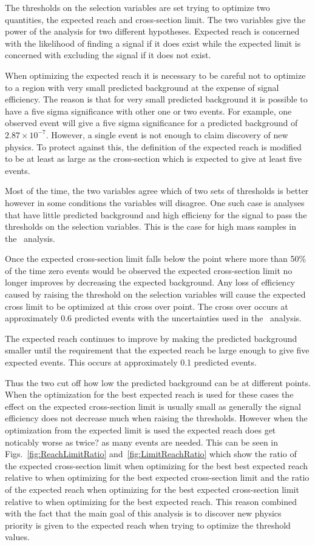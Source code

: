 The thresholds on the selection variables are set trying to optimize two quantities, the expected reach and cross-section limit.
The two variables give the power of the analysis for two different hypotheses. Expected reach is concerned with the likelihood of finding a signal if it does exist while the
expected limit is concerned with excluding the signal if it does not exist.

When optimizing the expected reach it is necessary to be careful not to optimize to
a region with very small predicted background at the expense of signal efficiency. 
The reason is that for very small predicted background it is possible to have a five sigma
significance with other one or two events. For example, one observed event will give a five sigma significance for a predicted background of $2.87\times10^{-7}$.
However, a single event is not enough to claim discovery of new physics. To protect against this, the definition of the expected reach is modified to be at least as large as
the cross-section which is expected to give at least five events.

Most of the time, the two variables agree which of two sets of thresholds is better however in some
conditions the variables will disagree. One such case is analyses that have little predicted background and high efficieny for the signal to pass the thresholds on the
selection variables. This is the case for high mass samples in the \tktof\ analysis.

Once the expected cross-section limit falls below the point where more than 50\% of the time zero events would be observed the expected cross-section limit no longer improves
by decreasing the expected background. Any loss of efficiency caused by raising the threshold on the selection variables will cause the expected cross limit to be optimized
at this cross over point. The cross over occurs at approximately 0.6 predicted events with the uncertainties used in the \tktof\ analysis. 

The expected reach continues to improve by making the predicted background smaller until the requirement that the expected reach be large enough to give five expected events. 
This occurs at approximately 0.1 predicted events. 

Thus the two cut off how low the predicted background can be at different points. When the optimization for the best expected reach is used for these cases the
effect on the expected cross-section limit is usually small as generally the signal efficiency does not decrease much when raising the thresholds. However
when the optimization from the expected limit is used the expected reach does get noticably worse as twice? as many events are needed. This can be seen in
Figs.~\ref{fig:ReachLimitRatio} and~\ref{fig:LimitReachRatio} which show the ratio of the expected cross-section limit when optimizing for the best best expected reach
relative to when optimizing for the best expected cross-section limit and the ratio of the expected reach when optimizing for the best expected cross-section limit
relative to when optimizing for the best expected reach. This reason combined with the fact that the main goal of this analysis is to discover new physics priority
is given to the expected reach when trying to optimize the threshold values.

